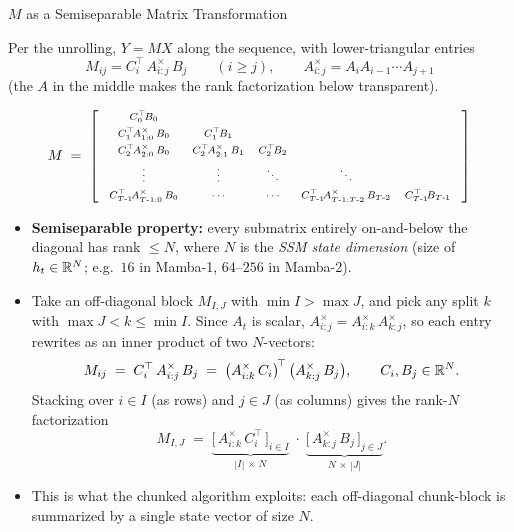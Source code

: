 \begin{frame}{$M$ as a Semiseparable Matrix Transformation}

  Per the unrolling, $Y = M X$ along the sequence, with lower-triangular entries
  \[
    M_{ij} = C_i^{\top}\, A_{i:j}^{\times}\, B_j \qquad (i \ge j),
    \qquad A_{i:j}^{\times} = A_i A_{i-1} \cdots A_{j+1}
  \]
  (the $A$ in the middle makes the rank factorization below transparent).

  \[
    \scriptsize
    M \;=\; \left[\;\begin{array}{ccccc}
      C_0^{\top}\! B_0 & & & & \\[3pt]
      C_1^{\top}\! A_{1:0}^{\times}\, B_0 & C_1^{\top}\! B_1 & & & \\[3pt]
      C_2^{\top}\! A_{2:0}^{\times}\, B_0 & C_2^{\top}\! A_{2:1}^{\times}\, B_1 & C_2^{\top}\! B_2 & & \\[3pt]
      \vdots & \vdots & \ddots & \ddots & \\[3pt]
      C_{T\text{-}1}^{\top}\! A_{T\text{-}1:0}^{\times}\, B_0 & \cdots & \cdots & C_{T\text{-}1}^{\top}\! A_{T\text{-}1:T\text{-}2}^{\times}\, B_{T\text{-}2} & C_{T\text{-}1}^{\top}\! B_{T\text{-}1}
    \end{array}\;\right]
  \]

  \vspace{0.4em}
  \begin{itemize}\small
    \item \textbf{Semiseparable property:} every submatrix entirely on-and-below the diagonal has rank $\le N$, where $N$ is the \emph{SSM state dimension} (size of $h_t \in \mathbb{R}^N$; e.g.\ $16$ in Mamba-1, $64$--$256$ in Mamba-2).
    \item Take an off-diagonal block $M_{I,J}$ with $\min I > \max J$, and pick any split $k$ with $\max J < k \le \min I$. Since $A_t$ is scalar, $A_{i:j}^{\times} = A_{i:k}^{\times}\, A_{k:j}^{\times}$, so each entry rewrites as an inner product of two $N$-vectors:
      \[
        M_{ij} \;=\; C_i^{\top}\, A_{i:j}^{\times}\, B_j
              \;=\; \bigl(A_{i:k}^{\times}\, C_i\bigr)^{\!\top}\, \bigl(A_{k:j}^{\times}\, B_j\bigr),
        \qquad C_i, B_j \in \mathbb{R}^{N}.
      \]
      Stacking over $i \in I$ (as rows) and $j \in J$ (as columns) gives the rank-$N$ factorization
      \[
        M_{I,J} \;=\;
        \underbrace{\bigl[\, A_{i:k}^{\times}\, C_i^{\top}\, \bigr]_{i \in I}}_{|I|\, \times\, N}
        \;\cdot\;
        \underbrace{\bigl[\, A_{k:j}^{\times}\, B_j\, \bigr]_{j \in J}}_{N\, \times\, |J|}.
      \]
    \item This is what the chunked algorithm exploits: each off-diagonal chunk-block is summarized by a single state vector of size $N$.
  \end{itemize}
\end{frame}

